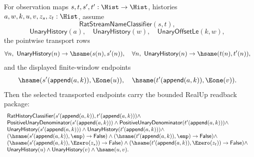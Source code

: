 \begin{theorem}
\label{thm:real-unary-streamname-window-endpoint-shape-package}
For observation maps $s,t,s',t':\Hist\to\Hist$, histories
$a,w,k,u,v,z_s,z_t:\Hist$, assume
$$
\mathsf{RatStreamNameClassifier}(s,t),
$$
$$
\mathsf{UnaryHistory}(a),\quad
\mathsf{UnaryHistory}(w),\quad
\mathsf{UnaryOffsetLe}(k,w),
$$
the pointwise transport rows
$$
\forall n,\ \mathsf{UnaryHistory}(n)\to\hsame(s(n),s'(n)),
\quad
\forall n,\ \mathsf{UnaryHistory}(n)\to\hsame(t(n),t'(n)),
$$
and the displayed finite-window endpoints
$$
\hsame(s'(\mathsf{append}(a,k)),\Eone(u)),
\quad
\hsame(t'(\mathsf{append}(a,k)),\Eone(v)).
$$
Then the selected transported endpoints carry the bounded RealUp readback
package:
$$
\begin{array}{l}
\mathsf{RatHistoryClassifier}
(s'(\mathsf{append}(a,k)),t'(\mathsf{append}(a,k)))\land\\
\mathsf{PositiveUnaryDenominator}(s'(\mathsf{append}(a,k)))\land
\mathsf{PositiveUnaryDenominator}(t'(\mathsf{append}(a,k)))\land\\
\mathsf{UnaryHistory}(s'(\mathsf{append}(a,k)))\land
\mathsf{UnaryHistory}(t'(\mathsf{append}(a,k)))\land\\
(\hsame(s'(\mathsf{append}(a,k)),\emp)\to\mathsf{False})\land
(\hsame(t'(\mathsf{append}(a,k)),\emp)\to\mathsf{False})\land\\
(\hsame(s'(\mathsf{append}(a,k)),\Ezero(z_s))\to\mathsf{False})\land
(\hsame(t'(\mathsf{append}(a,k)),\Ezero(z_t))\to\mathsf{False})\land\\
\mathsf{UnaryHistory}(u)\land
\mathsf{UnaryHistory}(v)\land
\hsame(u,v).
\end{array}
$$
\end{theorem}
